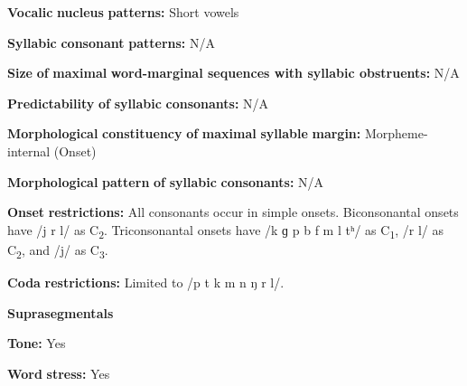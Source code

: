 \begin{styleBody}
\textbf{Vocalic} \textbf{nucleus} \textbf{patterns:} Short vowels
\end{styleBody}

\begin{styleBody}
\textbf{Syllabic} \textbf{consonant} \textbf{patterns:} N/A
\end{styleBody}

\begin{styleBody}
\textbf{Size} \textbf{of} \textbf{maximal} \textbf{word{}-marginal sequences with syllabic obstruents:} N/A
\end{styleBody}

\begin{styleBody}
\textbf{Predictability} \textbf{of} \textbf{syllabic} \textbf{consonants:} N/A
\end{styleBody}

\begin{styleBody}
\textbf{Morphological} \textbf{constituency} \textbf{of} \textbf{maximal} \textbf{syllable} \textbf{margin:} Morpheme-internal (Onset)
\end{styleBody}

\begin{styleBody}
\textbf{Morphological} \textbf{pattern} \textbf{of} \textbf{syllabic} \textbf{consonants:} N/A
\end{styleBody}

\begin{styleBody}
\textbf{Onset} \textbf{restrictions:} All consonants occur in simple onsets. Biconsonantal onsets have /j r l/ as C\textsubscript{2}. Triconsonantal onsets have /k ɡ p b f m l tʰ/ as C\textsubscript{1}, /r l/ as C\textsubscript{2}, and /j/ as C\textsubscript{3}.
\end{styleBody}

\begin{styleBody}
\textbf{Coda} \textbf{restrictions:} Limited to /p t k m n ŋ r l/.
\end{styleBody}

\begin{styleBody}
\textbf{Suprasegmentals}
\end{styleBody}

\begin{styleBody}
\textbf{Tone:} Yes
\end{styleBody}

\begin{styleBody}
\textbf{Word} \textbf{stress:} Yes
\end{styleBody}

